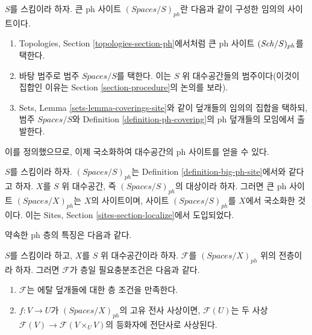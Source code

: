 \begin{definition}
\label{definition-big-ph-site}
$S$를 스킴이라 하자. 큰 ph 사이트 {\it $(\textit{Spaces}/S)_{ph}$}란
다음과 같이 구성한 임의의 사이트이다.
\begin{enumerate}
\item Topologies, Section \ref{topologies-section-ph}에서처럼 큰 ph 사이트
$(\mathit{Sch}/S)_{ph}$를 택한다.
\item 바탕 범주로 범주 $\textit{Spaces}/S$를 택한다. 이는 $S$ 위
대수공간들의 범주이다(이것이 집합인 이유는 Section
\ref{section-procedure}의 논의를 보라).
\item Sets, Lemma \ref{sets-lemma-coverings-site}와 같이 덮개들의 임의의
집합을 택하되, 범주 $\textit{Spaces}/S$와 Definition
\ref{definition-ph-covering}의 ph 덮개들의 모임에서 출발한다.
\end{enumerate}
\end{definition}

\noindent
이를 정의했으므로, 이제 국소화하여 대수공간의 ph 사이트를 얻을 수 있다.

\begin{definition}
\label{definition-big-small-ph}
$S$를 스킴이라 하자. $(\textit{Spaces}/S)_{ph}$는 Definition
\ref{definition-big-ph-site}에서와 같다고 하자. $X$를 $S$ 위 대수공간,
즉 $(\textit{Spaces}/S)_{ph}$의 대상이라 하자. 그러면 큰 ph 사이트
{\it $(\textit{Spaces}/X)_{ph}$}는 $X$의 사이트이며, 사이트
$(\textit{Spaces}/S)_{ph}$를 $X$에서 국소화한 것이다. 이는 Sites,
Section \ref{sites-section-localize}에서 도입되었다.
\end{definition}

\noindent
약속한 ph 층의 특징은 다음과 같다.

\begin{lemma}
\label{lemma-characterize-sheaf}
$S$를 스킴이라 하고, $X$를 $S$ 위 대수공간이라 하자. $\mathcal{F}$를
$(\textit{Spaces}/X)_{ph}$ 위의 전층이라 하자. 그러면 $\mathcal{F}$가
층일 필요충분조건은 다음과 같다.
\begin{enumerate}
\item $\mathcal{F}$는 에탈 덮개들에 대한 층 조건을 만족한다.
\item $f : V \to U$가 $(\textit{Spaces}/X)_{ph}$의 고유 전사 사상이면,
$\mathcal{F}(U)$는 두 사상
$\mathcal{F}(V) \to \mathcal{F}(V \times_U V)$의 등화자에 전단사로
사상된다.
\end{enumerate}
\end{lemma}

